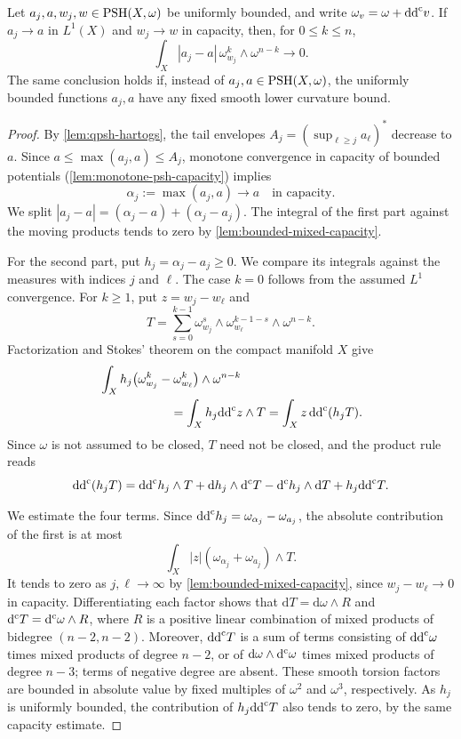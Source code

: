 \begin{lemma}\label{lem:moving-bounded-integrals}
Let $a_j,a,w_j,w\in\mathrm{PSH}(X,\omega)$ be uniformly bounded, and write $\omega_v=\omega+\mathrm{dd}^{\mathrm{c}} v$. If $a_j\to a$ in $L^1(X)$ and $w_j\to w$ in capacity, then, for $0\leq k\leq n$,
\[
 \int_X|a_j-a|\,\omega_{w_j}^{k}\wedge\omega^{n-k}
 \longrightarrow0.
\]
The same conclusion holds if, instead of $a_j,a\in\mathrm{PSH}(X,\omega)$, the uniformly bounded functions $a_j,a$ have any fixed smooth lower curvature bound.
\end{lemma}
\begin{proof}
By \cref{lem:qpsh-hartogs}, the tail envelopes $A_j=(\sup_{\ell\geq j}a_\ell)^*$ decrease to $a$. Since $a\leq\max(a_j,a)\leq A_j$, monotone convergence in capacity of bounded potentials (\cref{lem:monotone-psh-capacity}) implies
\[
 \alpha_j:=\max(a_j,a)\longrightarrow a\quad\text{in capacity}.
\]
We split $|a_j-a|=(\alpha_j-a)+(\alpha_j-a_j)$. The integral of the first part against the moving products tends to zero by \cref{lem:bounded-mixed-capacity}.

For the second part, put $h_j=\alpha_j-a_j\geq0$. We compare its integrals against the measures with indices $j$ and $\ell$. The case $k=0$ follows from the assumed $L^1$ convergence. For $k\geq1$, put $z=w_j-w_\ell$ and
\[
 T=\sum_{s=0}^{k-1}\omega_{w_j}^{s}\wedge
       \omega_{w_\ell}^{k-1-s}\wedge\omega^{n-k}.
\]
Factorization and Stokes' theorem on the compact manifold $X$ give
\begin{align*}
 &\int_Xh_j\bigl(\omega_{w_j}^{k}-\omega_{w_\ell}^{k}\bigr)
                      \wedge\omega^{n-k}\\
 &\hspace{20mm}=\int_Xh_j\ddc z\wedge T
 =\int_Xz\,\ddc(h_jT).
\end{align*}
Since $\omega$ is not assumed to be closed, $T$ need not be closed, and the product rule reads
\begin{equation}\label{eq:moving-measure-torsion}
 \mathrm{dd}^{\mathrm{c}}(h_jT)=\mathrm{dd}^{\mathrm{c}} h_j\wedge T+\mathrm{d}h_j\wedge\mathrm d^{\mathrm c} T
             -\mathrm d^{\mathrm c} h_j\wedge \mathrm{d}T+h_j\mathrm{dd}^{\mathrm{c}} T.
\end{equation}

We estimate the four terms. Since $\mathrm{dd}^{\mathrm{c}} h_j=\omega_{\alpha_j}-\omega_{a_j}$, the absolute contribution of the first is at most
\[
 \int_X|z|(\omega_{\alpha_j}+\omega_{a_j})\wedge T.
\]
It tends to zero as $j,\ell\to\infty$ by \cref{lem:bounded-mixed-capacity}, since $w_j-w_\ell\to0$ in capacity. Differentiating each factor shows that $\mathrm{d}T=\mathrm{d}\omega\wedge R$ and $\mathrm d^{\mathrm c} T=\mathrm d^{\mathrm c}\omega\wedge R$, where $R$ is a positive linear combination of mixed products of bidegree $(n-2,n-2)$. Moreover, $\mathrm{dd}^{\mathrm{c}} T$ is a sum of terms consisting of $\mathrm{dd}^{\mathrm{c}}\omega$ times mixed products of degree $n-2$, or of $\mathrm{d}\omega\wedge\mathrm d^{\mathrm c}\omega$ times mixed products of degree $n-3$; terms of negative degree are absent. These smooth torsion factors are bounded in absolute value by fixed multiples of $\omega^2$ and $\omega^3$, respectively. As $h_j$ is uniformly bounded, the contribution of $h_j\mathrm{dd}^{\mathrm{c}} T$ also tends to zero, by the same capacity estimate.


\end{proof}
